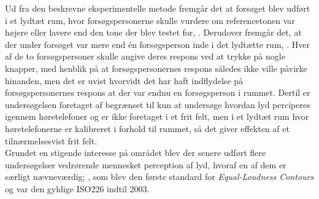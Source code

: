 \blankline
Ud fra den beskrevne eksperimentelle metode fremgår det at forsøget blev udført i et lydtæt rum, hvor forsøgspersonerne skulle vurdere om referencetonen var højere eller lavere end den tone der blev testet for, \parencite[s. 104]{PDF:FletcherMunson}. Derudover fremgår det, at der under forsøget var mere end én forsøgsperson inde i det lydtætte rum, \parencite[s. 104]{PDF:FletcherMunson}. Hver af de to forsøgspersoner skulle angive deres respons ved at trykke på nogle knapper, med henblik på at forsøgspersonernes respons således ikke ville påvirke hinanden, men det er uvist hvorvidt det har haft indflydelse på forsøgspersonernes respons at der var endnu en forsøgsperson i rummet. Dertil er undersøgelsen foretaget af \textcite{PDF:FletcherMunson} begrænset til kun at undersøge hvordan lyd perciperes igennem høretelefoner og er ikke foretaget i et frit felt, men i et lydtæt rum hvor høretelefonerne er kalibreret i forhold til rummet, så det giver effekten af et tilnærmelsesvist frit felt.\\
Grundet en stigende interesse på området blev der senere udført flere undersøgelser vedrørende mennesket perception af lyd, hvoraf en af dem er særligt nævneværdig; \textcite{PDF:RobinsonDadson}, som blev den første standard for \textit{Equal-Loudness Contours} og var den gyldige ISO226 indtil 2003. 
%
\newpage
\noindent
%
